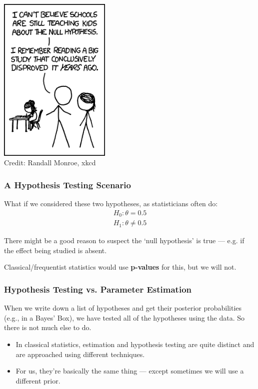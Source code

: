 \documentclass{beamer}
\begin{document}
\begin{frame}
\begin{center}
\includegraphics[width=0.4\textwidth]{images/null_hypothesis.png} \\
Credit: Randall Monroe, xkcd
\end{center}

\end{frame}


\begin{frame}
\frametitle{A Hypothesis Testing Scenario}
What if we considered these two hypotheses, as statisticians often do:
\begin{align}
H_0: \theta = 0.5 \\
H_1: \theta \neq 0.5
\end{align}
\pause

There might be a good reason to suspect the `null hypothesis' is true ---
e.g. if the effect being studied is absent.\pause

Classical/frequentist statistics would use {\bf p-values} for this, but we
will not.
\end{frame}


\begin{frame}
\frametitle{Hypothesis Testing vs. Parameter Estimation}
When we write down a list of hypotheses and get their
posterior probabilities (e.g., in a Bayes' Box), we have tested all of the
hypotheses using the data. So there is not much else to do.
\pause
\begin{itemize}
\item In classical statistics, estimation and hypothesis testing
are quite distinct and are approached using different techniques.\pause
\item For us, they're basically the same thing --- except sometimes we will use a
different prior.
\end{itemize}

\end{frame}
\end{document}

